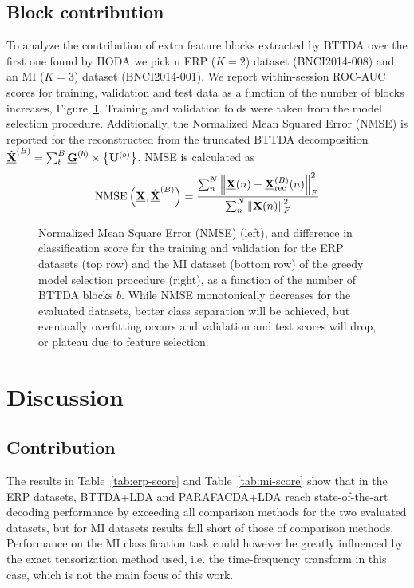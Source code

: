 \subsection{Block contribution}
To analyze the contribution of extra feature blocks extracted by {BTTDA} over
the first one found by HODA we pick n ERP ($K=2$) dataset
(BNCI2014-008) and an MI ($K=3$) dataset (BNCI2014-001).
We report within-session ROC-AUC scores for training, validation and test data as a function
of the number of blocks increases, Figure~\ref{fig:blocks}.
Training and validation folds were taken from the model selection procedure.
Additionally, the Normalized Mean Squared Error (NMSE) is reported for the
reconstructed from the truncated BTTDA decomposition
$\textstyle{\hat{\underline{\mathbf{X}}}^{(B)}=\sum_b^B\underline{\mathbf{G}}^{(b)}\times\left\{\mathbf{U}^{(b)}\right\}}$.
NMSE is calculated as
\begin{equation}
  \operatorname{NMSE}\left(\underline{\mathbf{X}}, \hat{\underline{\mathbf{X}}}^{(B)}\right) =
	\frac{\sum_n^N\left\lVert\underline{\mathbf{X}}(n)-\underline{\mathbf{X}}_\text{rec}^{(B)}(n)\right\rVert_F^2}
	{\sum_n^N\left\lVert\underline{\mathbf{X}}(n)\right\rVert_F^2}
\end{equation}
\begin{figure}[t]
	
  \caption[Analysis of NMSE and classification score per block.]{%
    Normalized Mean Square Error (NMSE) (left), and difference in
    classification score for the training and validation for the ERP datasets
    (top row) and the MI dataset (bottom row)	of the greedy model selection
    procedure (right), as a function of the number of BTTDA blocks $b$.
		While NMSE monotonically decreases for the evaluated datasets, better class
		separation will be achieved, but eventually overfitting occurs and validation
		and test scores will drop, or plateau due to feature selection.
	}
	\label{fig:blocks}
\end{figure}


\section{Discussion}
\subsection{Contribution}
The results in Table~\ref{tab:erp-score} and Table~\ref{tab:mi-score} show that
in the ERP datasets, BTTDA+LDA and PARAFACDA+LDA reach state-of-the-art decoding performance by
exceeding all comparison methods for the two evaluated datasets, but
for MI datasets results fall short of those of comparison methods.
Performance on the MI classification task could however be greatly influenced
by the exact tensorization method used, i.e. the time-frequency transform in
this case, which is not the main focus of this work.

